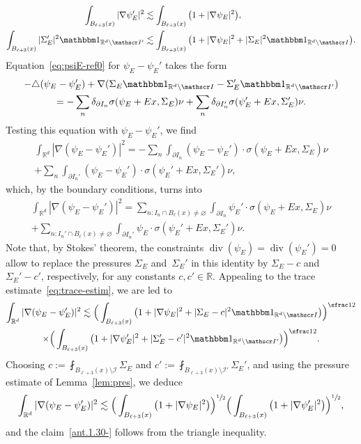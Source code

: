 \documentclass[JEP,XML,SOM,Unicode,published]{cedram}
\let\mathcal\mathscr
\let\mathds\mathbbm
\theoremstyle{plain}
\theoremstyle{definition}
\newcommand{\R}{\mathbb R}
\newcommand{\Ic}{\mathcal I}
\newcommand{\Div}{{\operatorname{div}}}
\newcommand{\Step}[1]{\Subsubsection*{Step #1}\mbox{}\vspace*{-\baselineskip}}
\begin{document}
\Step{3. Proof of}
\begin{align}
\int_{B_{\ell+3}(x)}|\nabla\psi_E'|^2&\lesssim \int_{B_{\ell+3}(x)}\big(1+|\nabla\psi_E|^2\big),\label{ant.1.30-}\\
\int_{B_{\ell+3}(x)}|\Sigma_E'|^2\mathds1_{\R^d\setminus\Ic'}&\lesssim \int_{B_{\ell+3}(x)}\big(1+|\nabla\psi_E|^2+|\Sigma_E|^2\mathds1_{\R^d\setminus\Ic}\big).\label{ant.1.3}
\end{align}
Equation~\eqref{eq:psiE-ref0} for $\psi_E-\psi_E'$ takes the form
\begin{multline}\label{eq:diff-psi-def}
-\triangle(\psi_E-\psi_E')+\nabla(\Sigma_E\mathds1_{\R^d\setminus\Ic}-\Sigma_E'\mathds1_{\R^d\setminus\Ic'})\\
=-\sum_n\delta_{\partial I_n}\sigma(\psi_E+Ex,\Sigma_E)\nu+\sum_n\delta_{\partial I_n'}\sigma(\psi_E'+Ex,\Sigma_E')\nu.
\end{multline}
Testing this equation with $\psi_E-\psi_E'$, we find
\begin{multline*}
\int_{\R^d}|\nabla(\psi_E-\psi_E')|^2
=-\sum_n\int_{\partial I_n}(\psi_E-\psi_E')\cdot\sigma(\psi_E+Ex,\Sigma_E)\nu\\
+\sum_n\int_{\partial I_n'}(\psi_E-\psi_E')\cdot\sigma(\psi_E'+Ex,\Sigma_E')\nu,
\end{multline*}
which, by the boundary conditions, turns into
\begin{multline}\label{eq:eqn-psi-psi'0}
\int_{\R^d}|\nabla(\psi_E-\psi_E')|^2
=\sum_{n:I_n\cap B_\ell(x)\ne\varnothing}\int_{\partial I_n}\psi_E'\cdot\sigma(\psi_E+Ex,\Sigma_E)\nu\\
+\sum_{n:I_n'\cap B_\ell(x)\ne\varnothing}\int_{\partial I_n'}\psi_E\cdot\sigma(\psi_E'+Ex,\Sigma_E')\nu.
\end{multline}
Note that, by Stokes' theorem, the constraints $\Div(\psi_E)=\Div(\psi_E')=0$ allow to replace the pressures $\Sigma_E$ and~$\Sigma_E'$ in this identity by $\Sigma_E-c$ and $\Sigma_E'-c'$, respectively, for any constants $c,c'\in\R$.
Appealing to the trace estimate~\eqref{eq:trace-estim}, we are led to
\begin{multline*}
\int_{\R^d}|\nabla(\psi_E-\psi_E')|^2
\lesssim \Big(\int_{B_{\ell+3}(x)}\big(1+|\nabla\psi_E|^2+|\Sigma_E-c|^2\mathds1_{\R^d\setminus\Ic}\big)\Big)^{\sfrac12}\\
\times\Big(\int_{B_{\ell+3}(x)}\big(1+|\nabla\psi_E'|^2+|\Sigma_E'-c'|^2\mathds1_{\R^d\setminus\Ic'}\big)\Big)^{\sfrac12}.
\end{multline*}
Choosing $c:=\fint_{B_{\ell+3}(x)\setminus\Ic }\Sigma_E$ and $c':=\fint_{B_{\ell+3}(x)\setminus\Ic'}\Sigma_E'$,
and using the pressure estimate of Lemma~\ref{lem:pres}, we deduce
\begin{equation}\label{eq:preant1.3}
\int_{\R^d}|\nabla(\psi_E-\psi_E')|^2
\lesssim \Big(\int_{B_{\ell+3}(x)}\big(1+|\nabla\psi_E|^2\big)\Big)^{\sfrac12}
\Big(\int_{B_{\ell+3}(x)}\big(1+|\nabla\psi_E'|^2\big)\Big)^{\sfrac12},
\end{equation}
and the claim~\eqref{ant.1.30-} follows from the triangle inequality.
\end{document}
